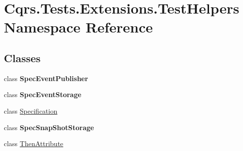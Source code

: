 \hypertarget{namespaceCqrs_1_1Tests_1_1Extensions_1_1TestHelpers}{}\section{Cqrs.\+Tests.\+Extensions.\+Test\+Helpers Namespace Reference}
\label{namespaceCqrs_1_1Tests_1_1Extensions_1_1TestHelpers}
\subsection*{Classes}
\begin{DoxyCompactItemize}
\item 
class {\bfseries Spec\+Event\+Publisher}
\item 
class {\bfseries Spec\+Event\+Storage}
\item 
class \hyperlink{classCqrs_1_1Tests_1_1Extensions_1_1TestHelpers_1_1Specification}{Specification}
\item 
class {\bfseries Spec\+Snap\+Shot\+Storage}
\item 
class \hyperlink{classCqrs_1_1Tests_1_1Extensions_1_1TestHelpers_1_1ThenAttribute}{Then\+Attribute}
\end{DoxyCompactItemize}
